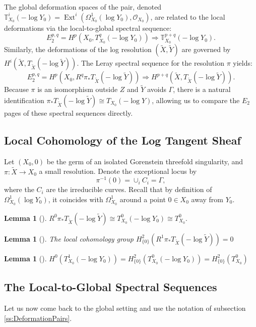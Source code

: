 \documentclass[10pt,a4paper]{amsart}
\newtheorem{lem}[thm]{Lemma}
\newcommand{\OO}{\mathcal{O}}
\newcommand{\push}{\pi_*}             %
\begin{document}
The global deformation spaces of the pair, denoted $\mathbb{T}_{X_0}^i(-\log Y_0) = \operatorname{Ext}^i(\Omega_{X_0}^1(\log Y_0), \OO_{X_0})$, are related to the local deformations via the local-to-global spectral sequence:
\[
E_2^{p,q} = H^p(X_0, T_{X_0}^q(-\log Y_0)) \Rightarrow \mathbb{T}_{X_0}^{p+q}(-\log Y_0).
\]
Similarly, the deformations of the log resolution $(\tilde{X}, \tilde{Y})$ are governed by $H^i(\tilde{X}, T_{\tilde{X}}(-\log \tilde{Y}))$. The Leray spectral sequence for the resolution $\pi$ yields:
\[
E_2^{p,q} = H^p(X_0, R^q \pi_* T_{\tilde{X}}(-\log \tilde{Y})) \Rightarrow H^{p+q}(\tilde{X}, T_{\tilde{X}}(-\log \tilde{Y})).
\]
Because $\pi$ is an isomorphism outside $Z$ and $\tilde{Y}$ avoids $\Gamma$, there is a natural identification $\pi_* T_{\tilde{X}}(-\log \tilde{Y}) \cong T_{X_0}(-\log Y)$, allowing us to compare the $E_2$ pages of these spectral sequences directly.

\subsection{Local Cohomology of the Log Tangent Sheaf}
Let $(X_0,0)$ be the germ of an isolated Gorenstein threefold singularity, and $\pi:\tilde{X}\to X_0$ a small resolution. Denote the exceptional locus by 
$$\pi^{-1}(0)=\cup_i C_i=\Gamma,$$
where the $C_i$ are the irreducible curves. 
Recall that by definition of $\Omega_{X_0}^1(\log Y_0)$, it coincides with $\Omega_{X_0}^1$ around a point $0\in X_0$ away from $Y_0$.
\begin{lem}[{\cite[Lemma 3.1]{F86}}]\label{lem:log_tangent_pushforward} $R^0\push T_{\tilde{X}}(-\log \tilde{Y})\cong T^0_{X_0}(-\log Y_0)\cong T_{X_0}^0 .$
\end{lem}

\begin{lem}[{\cite[Lemma 3.2]{F86}}] \label{lem:log_higher_direct_images}
The local cohomology group $H^2_{\{0\}}(R^1\push T_{\tilde{X}}(-\log \tilde{Y}))=0$
\end{lem}

\begin{lem}[{\cite[Lemma 3.3]{F86}}]\label{lem:Schlessinger} $H^0(T_{X_0}^1(-\log Y_0))=H^2_{\{0\}}(T_{X_0}^0(-\log Y_0))=H^2_{\{0\}}(T_{X_0}^0) $  
\end{lem}

\subsection{The Local-to-Global Spectral Sequences}
Let us now come back to the global setting and use the notation of subsection \ref{ss:DeformationPairs}.
\end{document}
